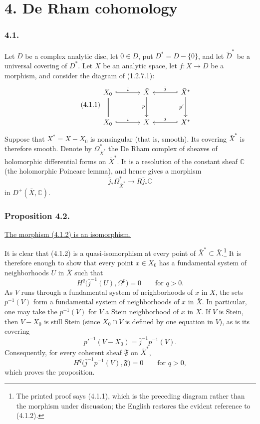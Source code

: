 \section*{4. De Rham cohomology}

\subsubsection*{4.1.}
Let $D$ be a complex analytic disc, let $0\in D$, put
$D^*=D-\{0\}$, and let $\widetilde D^*$ be a universal covering of
$D^*$.  Let $X$ be an analytic space, let
$f:X\longrightarrow D$ be a morphism, and consider the diagram of
(1.2.7.1):
\begin{equation}\tag{4.1.1}
\begin{tikzcd}[column sep=large,row sep=large]
X_0 \arrow[r,hook,"\bar i"] \arrow[d,equal]
  & \bar X \arrow[d,"p"']
  & \bar X^* \arrow[l,hook',"\bar j"'] \arrow[d,"p'"'] \\
X_0 \arrow[r,hook,"i"]
  & X
  & X^* \arrow[l,hook',"j"']
\end{tikzcd}
\end{equation}
Suppose that $X^*=X-X_0$ is nonsingular (that is, smooth).  Its
covering $\bar X^*$ is therefore smooth.  Denote by
$\Omega_{\bar X^*}^*$ the De Rham complex of sheaves of holomorphic
differential forms on $\bar X^*$.  It is a resolution of the constant
sheaf $\mathbb C$ (the holomorphic Poincare lemma), and hence gives a
morphism
\begin{equation}\tag{4.1.2}
\bar j_*\Omega_{\bar X^*}^*
\longrightarrow R\bar j_*\mathbb C
\end{equation}
in $D^+(\bar X,\mathbb C)$.

\subsubsection*{Proposition 4.2.}
\underline{The morphism (4.1.2) is an isomorphism.}

It is clear that (4.1.2) is a quasi-isomorphism at every point of
$\bar X^*\subset\bar X$.\footnote{The printed proof says (4.1.1),
which is the preceding diagram rather than the morphism under
discussion; the English restores the evident reference to (4.1.2).}
It is therefore enough to show that every point $x\in X_0$ has a
fundamental system of neighborhoods $U$ in $\bar X$ such that
\[
H^q\bigl(\bar j^{-1}(U),\Omega^p\bigr)=0
\qquad\text{for }q>0.
\]
As $V$ runs through a fundamental system of neighborhoods of $x$ in
$X$, the sets $p^{-1}(V)$ form a fundamental system of neighborhoods
of $x$ in $\bar X$.  In particular, one may take the $p^{-1}(V)$ for
$V$ a Stein neighborhood of $x$ in $X$.  If $V$ is Stein, then
$V-X_0$ is still Stein (since $X_0\cap V$ is defined by one equation
in $V$), as is its covering
\[
p'^{-1}(V-X_0)=\bar j^{-1}p^{-1}(V).
\]
Consequently, for every coherent sheaf $\mathfrak F$ on $\bar X^*$,
\[
H^q\bigl(\bar j^{-1}p^{-1}(V),\mathfrak F\bigr)=0
\qquad\text{for }q>0,
\]
which proves the proposition.

